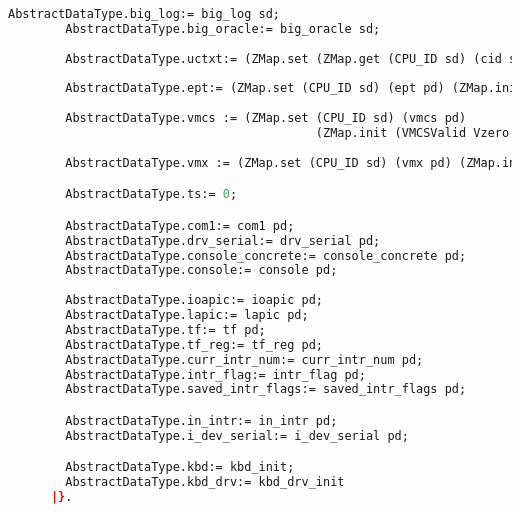\begin{lstlisting}[language=Caml]
        AbstractDataType.big_log:= big_log sd;
        AbstractDataType.big_oracle:= big_oracle sd;
        
        AbstractDataType.uctxt:= (ZMap.set (ZMap.get (CPU_ID sd) (cid sd)) (uctxt pd)  (ZMap.init (ZMap.init Vundef)));
        
        AbstractDataType.ept:= (ZMap.set (CPU_ID sd) (ept pd) (ZMap.init (ZMap.init EPML4EUndef)));
        
        AbstractDataType.vmcs := (ZMap.set (CPU_ID sd) (vmcs pd) 
                                           (ZMap.init (VMCSValid Vzero Vzero (ZMap.init Vundef))));
        
        AbstractDataType.vmx := (ZMap.set (CPU_ID sd) (vmx pd) (ZMap.init (ZMap.init Vundef)));

        AbstractDataType.ts:= 0;

        AbstractDataType.com1:= com1 pd;
        AbstractDataType.drv_serial:= drv_serial pd;
        AbstractDataType.console_concrete:= console_concrete pd;
        AbstractDataType.console:= console pd;
        
        AbstractDataType.ioapic:= ioapic pd;
        AbstractDataType.lapic:= lapic pd; 
        AbstractDataType.tf:= tf pd;
        AbstractDataType.tf_reg:= tf_reg pd;
        AbstractDataType.curr_intr_num:= curr_intr_num pd;
        AbstractDataType.intr_flag:= intr_flag pd;
        AbstractDataType.saved_intr_flags:= saved_intr_flags pd;

        AbstractDataType.in_intr:= in_intr pd;
        AbstractDataType.i_dev_serial:= i_dev_serial pd;

        AbstractDataType.kbd:= kbd_init;
        AbstractDataType.kbd_drv:= kbd_drv_init
      |}.
\end{lstlisting}

